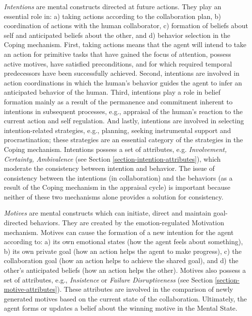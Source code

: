 \documentclass[12pt]{report}
\begin{document}
\textit{Intentions} are mental constructs directed at future actions. They play
an essential role in: a) taking actions according to the collaboration plan, b)
coordination of actions with the human collaborator, c) formation of beliefs
about self and anticipated beliefs about the other, and d) behavior selection in
the Coping mechanism. First, taking actions means that the agent will intend to
take an action for primitive tasks that have gained the focus of attention,
possess active motives, have satisfied preconditions, and for which required
temporal predecessors have been successfully achieved. Second, intentions are
involved in action coordinations in which the human's behavior guides the agent
to infer an anticipated behavior of the human. Third, intentions play a role in
belief formation mainly as a result of the permanence and commitment inherent to
intentions in subsequent processes, e.g., appraisal of the human's reaction to
the current action and self regulation. And lastly, intentions are involved in
selecting intention-related strategies, e.g., planning, seeking instrumental
support and procrastination; these strategies are an essential category of the
strategies in the Coping mechanism. Intentions possess a set of attributes, e.g.
\textit{Involvement, Certainty, Ambivalence} (see Section
\ref{section-intention-attributes}), which moderate the consistency between
intention and behavior. The issue of consistency between the intentions (in
collaboration) and the behaviors (as a result of the Coping mechanism in the
appraisal cycle) is important because neither of these two mechanisms alone
provides a solution for consistency.

\textit{Motives} are mental constructs which can initiate, direct and maintain
goal-directed behaviors. They are created by the emotion-regulated Motivation
mechanism. Motives can cause the formation of a new intention for the agent
according to: a) its own emotional states (how the agent feels about something),
b) its own private goal (how an action helps the agent to make progress), c) the
collaboration goal (how an action helps to achieve the shared goal), and d) the
other's anticipated beliefs (how an action helps the other). Motives also
possess a set of attributes, e.g., \textit{Insistence} or \textit{Failure
Disruptiveness} (see Section \ref{section-motive-attributes}). These attributes
are involved in the comparison of newly generated motives based on the current
state of the collaboration. Ultimately, the agent forms or updates a belief
about the winning motive in the Mental State.
\end{document}
